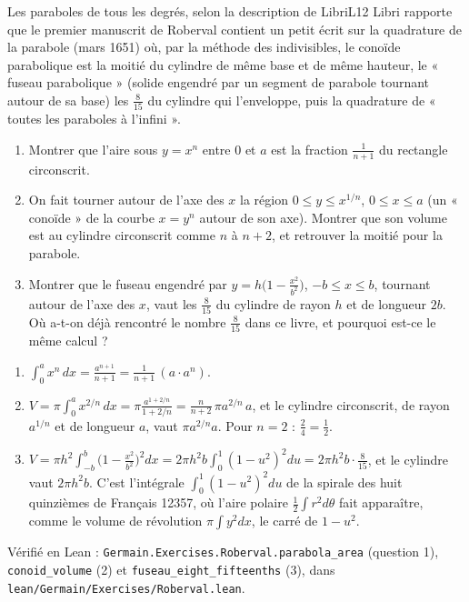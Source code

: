 \documentclass[11pt,a4paper]{article}
\begin{document}
\begin{exercice}{Les paraboles de tous les degrés, selon la description de Libri}{L1}{2}
Libri rapporte que le premier manuscrit de Roberval contient un petit écrit sur la
quadrature de la parabole (mars 1651) où, par la méthode des indivisibles, le
conoïde parabolique est la moitié du cylindre de même base et de même hauteur, le
« fuseau parabolique » (solide engendré par un segment de parabole tournant autour
de sa base) les $\frac{8}{15}$ du cylindre qui l'enveloppe, puis la quadrature de
« toutes les paraboles à l'infini ».


\begin{enumerate}
\item Montrer que l'aire sous $y = x^n$ entre $0$ et $a$ est la fraction
  $\frac{1}{n+1}$ du rectangle circonscrit.
\item On fait tourner autour de l'axe des $x$ la région $0 \le y \le x^{1/n}$,
  $0 \le x \le a$ (un « conoïde » de la courbe $x = y^n$ autour de son axe). Montrer
  que son volume est au cylindre circonscrit comme $n$ à $n + 2$, et retrouver la
  moitié pour la parabole.
\item Montrer que le fuseau engendré par $y = h\bigl(1 - \frac{x^2}{b^2}\bigr)$,
  $-b \le x \le b$, tournant autour de l'axe des $x$, vaut les $\frac{8}{15}$ du
  cylindre de rayon $h$ et de longueur $2b$. Où a-t-on déjà rencontré le nombre
  $\frac{8}{15}$ dans ce livre, et pourquoi est-ce le même calcul ?
\end{enumerate}
\end{exercice}

\begin{solution}
\begin{enumerate}
\item $\int_0^a x^n\,dx = \frac{a^{n+1}}{n+1} = \frac{1}{n+1}\,(a\cdot a^n)$.
\item $V = \pi\int_0^a x^{2/n}\,dx = \pi\frac{a^{1+2/n}}{1 + 2/n} =
  \frac{n}{n+2}\,\pi a^{2/n}\,a$, et le cylindre circonscrit, de rayon $a^{1/n}$ et
  de longueur $a$, vaut $\pi a^{2/n}a$. Pour $n = 2$ : $\frac24 = \frac12$.
\item $V = \pi h^2\int_{-b}^{b}\bigl(1 - \frac{x^2}{b^2}\bigr)^2dx =
  2\pi h^2 b\int_0^1(1 - u^2)^2du = 2\pi h^2 b\cdot\frac{8}{15}$, et le cylindre vaut
  $2\pi h^2 b$. C'est l'intégrale $\int_0^1(1-u^2)^2du$ de la spirale des huit
  quinzièmes de Français 12357, où l'aire polaire $\frac12\int r^2d\theta$ fait
  apparaître, comme le volume de révolution $\pi\int y^2dx$, le carré de
  $1 - u^2$.
\end{enumerate}

Vérifié en Lean : \texttt{Germain.Exercises.Roberval.parabola\_area} (question 1),
\texttt{conoid\_volume} (2) et \texttt{fuseau\_eight\_fifteenths} (3), dans \texttt{lean/Germain/Exercises/Roberval.lean}.
\end{solution}
\end{document}
